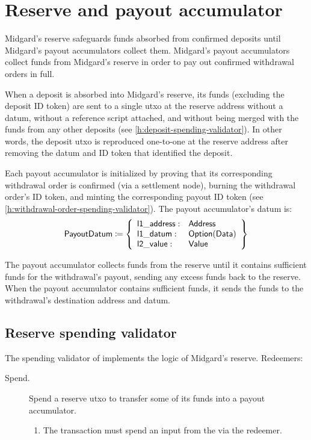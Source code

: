 \documentclass[../midgard.tex]{subfiles}
\begin{document}
\section{Reserve and payout accumulator}
\label{h:reserve-and-payout-accumulator}

Midgard's reserve safeguards funds absorbed from confirmed deposits until Midgard's payout accumulators collect them.
Midgard's payout accumulators collect funds from Midgard's reserve in order to pay out confirmed withdrawal orders in full.

When a deposit is absorbed into Midgard's reserve, its funds (excluding the deposit ID token) are sent to a single utxo at the reserve address without a datum, without a reference script attached, and without being merged with the funds from any other deposits (see \cref{h:deposit-spending-validator}).
In other words, the deposit utxo is reproduced one-to-one at the reserve address after removing the datum and ID token that identified the deposit.

Each payout accumulator is initialized by proving that its corresponding withdrawal order is confirmed (via a settlement node), burning the withdrawal order's ID token, and minting the corresponding payout ID token (see \cref{h:withdrawal-order-spending-validator}).
The payout accumulator's datum is:
\begin{equation*}
  \mathsf{PayoutDatum} \coloneq \left\{
  \begin{array}{ll}
    \mathsf{l1\_address}: & \mathsf{Address} \\
    \mathsf{l1\_datum}: & \mathsf{Option}(\mathsf{Data}) \\
    \mathsf{l2\_value}: & \mathsf{Value}
  \end{array}\right\}
\end{equation*}

The payout accumulator collects funds from the reserve until it contains sufficient funds for the withdrawal's payout, sending any excess funds back to the reserve.
When the payout accumulator contains sufficient funds, it sends the funds to the withdrawal's destination address and datum.

\subsection{Reserve spending validator}%
\label{h:reserve-spending-validator}%

The spending validator of  implements the logic of Midgard's reserve.
Redeemers:
\begin{description}
  \item[Spend.] Spend a reserve utxo to transfer some of its funds into a payout accumulator.
    \begin{enumerate}
      \item The transaction must spend an input from the  via the  redeemer.
    \end{enumerate}
\end{description}
\end{document}
